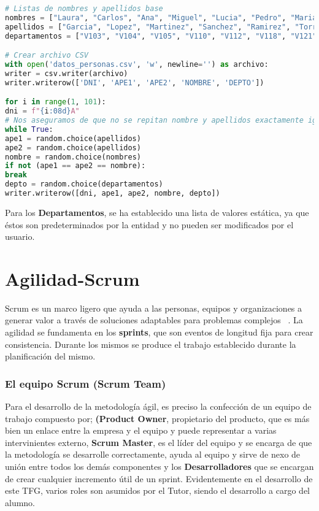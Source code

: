 \begin{lstlisting}[language=Python, caption={Generación de\textit{Datos MOCK} para la tabla Responsables}]
# Listas de nombres y apellidos base
nombres = ["Laura", "Carlos", "Ana", "Miguel", "Lucia", "Pedro", "Maria","Javier"]
apellidos = ["Garcia", "Lopez", "Martinez", "Sanchez", "Ramirez", "Torres", "Vega", "Diaz"]
departamentos = ["V103", "V104", "V105", "V110", "V112", "V118", "V121", "V122", "V123"]

# Crear archivo CSV
with open('datos_personas.csv', 'w', newline='') as archivo:
writer = csv.writer(archivo)
writer.writerow(['DNI', 'APE1', 'APE2', 'NOMBRE', 'DEPTO'])

for i in range(1, 101):
dni = f"{i:08d}A"
# Nos aseguramos de que no se repitan nombre y apellidos exactamente igual
while True:
ape1 = random.choice(apellidos)
ape2 = random.choice(apellidos)
nombre = random.choice(nombres)
if not (ape1 == ape2 == nombre):
break
depto = random.choice(departamentos)
writer.writerow([dni, ape1, ape2, nombre, depto])
\end{lstlisting}

Para los \textbf{Departamentos}, se ha establecido una lista de valores estática, ya que éstos son predeterminados por la entidad y no pueden ser modificados por el usuario.

\section{Agilidad-Scrum}
Scrum es un marco ligero que ayuda a las personas, equipos y organizaciones a generar valor a través de soluciones adaptables para problemas complejos ~\cite{SchwaberGuiaDefinitivaScrum2020}.
La agilidad se fundamenta en los \textbf{sprints}, que son eventos de longitud fija para crear consistencia. Durante los mismos se produce el trabajo establecido durante la planificación del mismo.

\subsubsection{El equipo Scrum (Scrum Team)}
Para el desarrollo de la metodología ágil, es preciso la confección de un equipo de trabajo compuesto por; \textbf{(Product Owner}, propietario del producto, que es más bien un enlace entre la empresa y el equipo y puede representar a varias intervinientes externo, \textbf{Scrum Master}, es el líder del equipo y se encarga de que la metodología se desarrolle correctamente, ayuda al equipo y sirve de nexo de unión entre todos los demás componentes y los \textbf{Desarrolladores} que se encargan de crear cualquier incremento útil de un sprint.
Evidentemente en el desarrollo de este \acrshort{TFG}, varios roles son asumidos por el Tutor, siendo el desarrollo a cargo del alumno.

